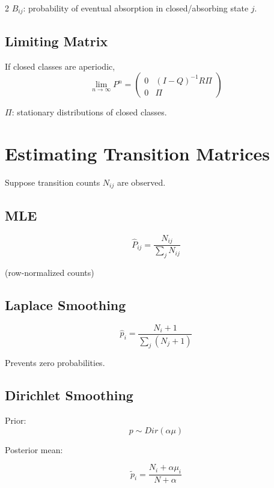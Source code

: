 \documentclass[10pt]{article}
\begin{document}
\begin{multicols}{2}
\(B_{ij}\): probability of eventual absorption in closed/absorbing state \(j\).

\subsection{Limiting Matrix}

\begin{theorembox}
If closed classes are aperiodic,
\[
\lim_{n\to\infty}P^n=
\begin{pmatrix}
0 & (I-Q)^{-1}R\Pi\\
0 & \Pi
\end{pmatrix}
\]
\end{theorembox}

\(\Pi\): stationary distributions of closed classes.

\section{Estimating Transition Matrices}

Suppose transition counts \(N_{ij}\) are observed.

\subsection{MLE}

\begin{formulabox}
\[
\hat P_{ij}=
\frac{N_{ij}}{\sum_j N_{ij}}
\]
\end{formulabox}

(row-normalized counts)

\subsection{Laplace Smoothing}

\begin{formulabox}
\[
\hat p_i=
\frac{N_i+1}{\sum_j (N_j+1)}
\]
\end{formulabox}

Prevents zero probabilities.

\subsection{Dirichlet Smoothing}

Prior:
\[
p\sim Dir(\alpha\mu)
\]

Posterior mean:
\begin{formulabox}
\[
\tilde p_i=
\frac{N_i+\alpha\mu_i}{N+\alpha}
\]
\end{formulabox}


\end{multicols}
\end{document}

